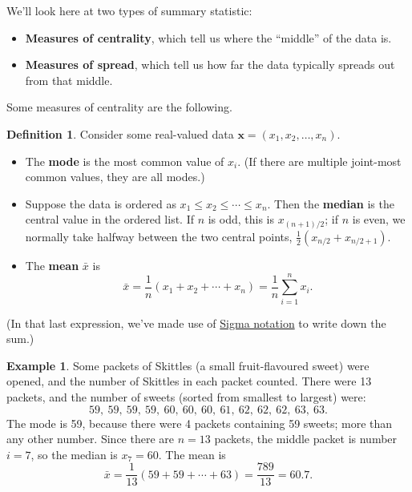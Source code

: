 \documentclass[
  a4paper,
]{book}
\providecommand{\tightlist}{%
  \setlength{\itemsep}{0pt}\setlength{\parskip}{0pt}}
\theoremstyle{definition}
\newtheorem{definition}{Definition}[chapter]
\theoremstyle{definition}
\newtheorem{example}{Example}[chapter]
\theoremstyle{definition}
\theoremstyle{definition}
\theoremstyle{remark}
\begin{document}
We'll look here at two types of summary statistic:

\begin{itemize}
\tightlist
\item
  \textbf{Measures of centrality}, which tell us where the ``middle'' of the data is.
\item
  \textbf{Measures of spread}, which tell us how far the data typically spreads out from that middle.
\end{itemize}

Some measures of centrality are the following.

\begin{definition}

Consider some real-valued data \(\mathbf x = (x_1, x_2, \dots, x_n)\).

\begin{itemize}
\tightlist
\item
  The \textbf{mode} is the most common value of \(x_i\). (If there are multiple joint-most common values, they are all modes.)
\item
  Suppose the data is ordered as \(x_1 \leq x_2 \leq \cdots \leq x_n\). Then the \textbf{median} is the central value in the ordered list. If \(n\) is odd, this is \(x_{(n+1)/2}\); if \(n\) is even, we normally take halfway between the two central points, \(\frac12(x_{n/2}+x_{n/2 + 1})\).
\item
  The \textbf{mean} \(\bar x\) is
  \[ \bar x = \frac{1}{n}(x_1 + x_2 + \cdots + x_n) = \frac1n \sum_{i=1}^n x_i . \]
\end{itemize}

\end{definition}

(In that last expression, we've made use of \href{https://www.mathcentre.ac.uk/resources/workbooks/mathcentre/sigma.pdf}{Sigma notation} to write down the sum.)

\begin{example}
Some packets of Skittles (a small fruit-flavoured sweet) were opened, and the number of Skittles in each packet counted. There were 13 packets, and the number of sweets (sorted from smallest to largest) were:
\[ 59, \ 59, \ 59, \ 59, \ 60, \ 60, \ 60, \ 61, \ 62, \ 62, \ 62, \ 63, \ 63 .\]
The mode is 59, because there were 4 packets containing 59 sweets; more than any other number. Since there are \(n = 13\) packets, the middle packet is number \(i = 7\), so the median is \(x_7 = 60\). The mean is
\[ \bar x = \frac{1}{13} (59 + 59 + \cdots + 63) = \frac{789}{13} = 60.7 .\]
\end{example}
\end{document}
